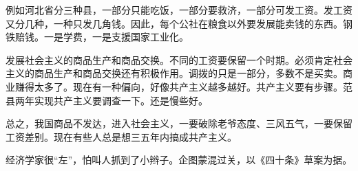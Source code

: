 例如河北省分三种县，一部分只能吃饭，一部分要救济，一部分可发工资。发工资又分几种，一种只发几角钱。因此，每个公社在粮食以外要发展能卖钱的东西。钢铁赔钱。一是学费，一是支援国家工业化。

发展社会主义的商品生产和商品交换。不同的工资要保留一个时期。必须肯定社会主义的商品生产和商品交换还有积极作用。调拨的只是一部分，多数不是买卖。商业赚得太多了。现在有一种偏向，好像共产主义越多越好。共产主义要有步骤。范县两年实现共产主义要调查一下。还是慢些好。

总之，我国商品不发达，进入社会主义，一要破除老爷态度、三风五气，一要保留工资差别。现在有些人总是想三五年内搞成共产主义。

经济学家很“左”，怕叫人抓到了小辫子。企图蒙混过关，以《四十条》草案为据。


